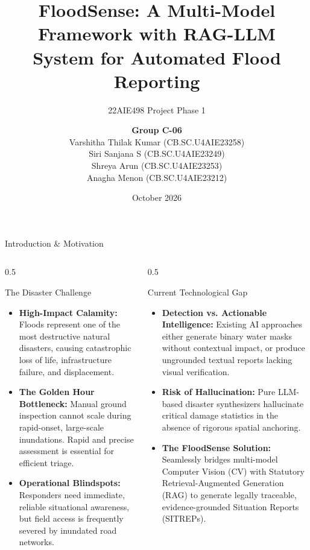 \documentclass[aspectratio=169, 10pt, professionalfonts]{beamer}
\title[FloodSense: Multi-Model Flood Reporting]{\textbf{FloodSense: A Multi-Model Framework with RAG-LLM System for Automated Flood Reporting}}
\subtitle{\large 22AIE498 Project Phase 1}
\author[Group C-06]{%
  \textbf{Group C-06}\\[0.6em]
  Varshitha Thilak Kumar \quad (CB.SC.U4AIE23258)\\[0.2em]
  Siri Sanjana S \quad (CB.SC.U4AIE23249)\\[0.2em]
  Shreya Arun \quad (CB.SC.U4AIE23253)\\[0.2em]
  Anagha Menon \quad (CB.SC.U4AIE23212)
}
\institute[Amrita Vishwa Vidyapeetham]{
  Department of Artificial Intelligence\\
  School of Computing, Amrita Vishwa Vidyapeetham\\[0.5em]
  \textbf{Project Supervisor:} Dr.~Mithun Kumar Kar
}
\date{October 2026}
\begin{document}
\begin{frame}[plain]
  \titlepage
\end{frame}

\begin{frame}{Introduction \& Motivation}
  \begin{columns}[T]
    \begin{column}{0.5\textwidth}
      \begin{block}{The Disaster Challenge}
        \begin{itemize}\setlength{\itemsep}{0.6em}
          \item \textbf{High-Impact Calamity:} Floods represent one of the most destructive natural disasters, causing catastrophic loss of life, infrastructure failure, and displacement.
          \item \textbf{The Golden Hour Bottleneck:} Manual ground inspection cannot scale during rapid-onset, large-scale inundations. Rapid and precise assessment is essential for efficient triage.
          \item \textbf{Operational Blindspots:} Responders need immediate, reliable situational awareness, but field access is frequently severed by inundated road networks.
        \end{itemize}
      \end{block}
    \end{column}
    
    \begin{column}{0.5\textwidth}
      \begin{block}{Current Technological Gap}
        \begin{itemize}\setlength{\itemsep}{0.6em}
          \item \textbf{Detection vs. Actionable Intelligence:} Existing AI approaches either generate binary water masks without contextual impact, or produce ungrounded textual reports lacking visual verification.
          \item \textbf{Risk of Hallucination:} Pure LLM-based disaster synthesizers hallucinate critical damage statistics in the absence of rigorous spatial anchoring.
          \item \textbf{The FloodSense Solution:} Seamlessly bridges multi-model Computer Vision (CV) with Statutory Retrieval-Augmented Generation (RAG) to generate legally traceable, evidence-grounded Situation Reports (SITREPs).
        \end{itemize}
      \end{block}
    \end{column}
  \end{columns}
\end{frame}
\end{document}
